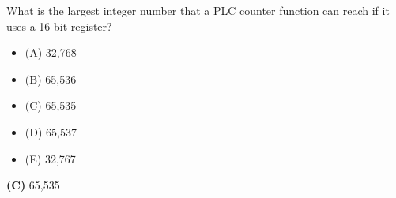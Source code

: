 

What is the largest integer number that a PLC counter function can reach if it uses a 16 bit register?

\begin{itemize}
\item{(A)} 32,768
\vskip 5pt 
\item{(B)} 65,536
\vskip 5pt 
\item{(C)} 65,535
\vskip 5pt 
\item{(D)} 65,537
\vskip 5pt 
\item{(E)} 32,767
\end{itemize}







{\bf (C)} 65,535
 










